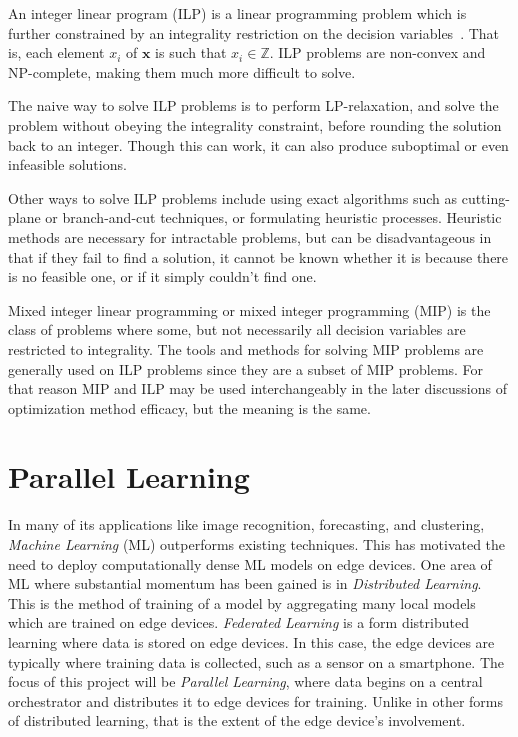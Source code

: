 \documentclass[../mthe-493-final-project.tex]{subfiles}
\begin{document}
    \label{sssec:integer-linear-programming}

        An integer linear program (ILP) is a linear programming problem which is further constrained by an integrality restriction on the decision variables~\cite{integer_programming}. That is, each element $x_i$ of $\mathbf{x}$ is such that $x_i \in \mathbb{Z}$. ILP problems are non-convex and NP-complete, making them much more difficult to solve.
        
        
        The naive way to solve ILP problems is to perform LP-relaxation, and solve the problem without obeying the integrality constraint, before rounding the solution back to an integer. Though this can work, it can also produce suboptimal or even infeasible solutions.
        
        Other ways to solve ILP problems include using exact algorithms such as cutting-plane or branch-and-cut techniques, or formulating heuristic processes. Heuristic methods are necessary for intractable problems, but can be disadvantageous in that if they fail to find a solution, it cannot be known whether it is because there is no feasible one, or if it simply couldn't find one.
        
        Mixed integer linear programming or mixed integer programming (MIP) is the class of problems where some, but not necessarily all decision variables are restricted to integrality. The tools and methods for solving MIP problems are generally used on ILP problems since they are a subset of MIP problems. For that reason MIP and ILP may be used interchangeably in the later discussions of optimization method efficacy, but the meaning is the same.

    \section{Parallel Learning}
    \label{sec:parallel-learning-bg}
    In many of its applications like image recognition, forecasting, and clustering, \textit{Machine Learning } (ML) outperforms existing techniques. This has motivated the need to deploy computationally dense ML models on edge devices. One area of ML where substantial momentum has been gained is in \textit{Distributed Learning}. This is the method of training of a model by aggregating many local models which are trained on edge devices. \textit{Federated Learning} is a form distributed learning where data is stored on edge devices. In this case, the edge devices are typically where training data is collected, such as a sensor on a smartphone. The focus of this project will be \textit{Parallel Learning}, where data begins on a central orchestrator and distributes it to edge devices for training. Unlike in other forms of distributed learning, that is the extent of the edge device’s involvement.
\end{document}
